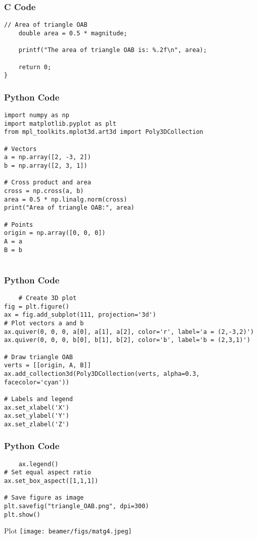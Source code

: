 \documentclass{beamer}
\begin{document}
\begin{frame}[fragile]
    \frametitle{C Code }
    \begin{lstlisting}
// Area of triangle OAB
    double area = 0.5 * magnitude;

    printf("The area of triangle OAB is: %.2f\n", area);

    return 0;
}
    \end{lstlisting}
\end{frame}
\begin{frame}[fragile]
    \frametitle{Python Code}
    \begin{lstlisting}
import numpy as np
import matplotlib.pyplot as plt
from mpl_toolkits.mplot3d.art3d import Poly3DCollection

# Vectors
a = np.array([2, -3, 2])
b = np.array([2, 3, 1])

# Cross product and area
cross = np.cross(a, b)
area = 0.5 * np.linalg.norm(cross)
print("Area of triangle OAB:", area)

# Points
origin = np.array([0, 0, 0])
A = a
B = b


    \end{lstlisting}
\end{frame}

\begin{frame}[fragile]
    \frametitle{Python Code}
    \begin{lstlisting}
    # Create 3D plot
fig = plt.figure()
ax = fig.add_subplot(111, projection='3d')
# Plot vectors a and b
ax.quiver(0, 0, 0, a[0], a[1], a[2], color='r', label='a = (2,-3,2)')
ax.quiver(0, 0, 0, b[0], b[1], b[2], color='b', label='b = (2,3,1)')

# Draw triangle OAB
verts = [[origin, A, B]]
ax.add_collection3d(Poly3DCollection(verts, alpha=0.3, facecolor='cyan'))

# Labels and legend
ax.set_xlabel('X')
ax.set_ylabel('Y')
ax.set_zlabel('Z')

    \end{lstlisting}
\end{frame}

\begin{frame}[fragile]
    \frametitle{Python Code}
    \begin{lstlisting}
    ax.legend()
# Set equal aspect ratio
ax.set_box_aspect([1,1,1])

# Save figure as image
plt.savefig("triangle_OAB.png", dpi=300)
plt.show()

    \end{lstlisting}
\end{frame}

\begin{frame}{Plot}
    \centering
    \texttt{[image: beamer/figs/matg4.jpeg]}     
\end{frame}
\end{document}
